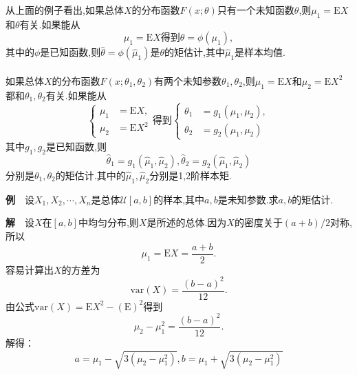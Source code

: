 	\begin{frame}
		从上面的例子看出,如果总体$X$的分布函数$F(x;\theta)$只有一个未知函数$\theta$,则$\mu_1 =\mathrm{E}X$和$\theta$有关.如果能从
		\begin{equation}
			\mu_1 = \mathrm{E}X \text{得到}\theta = \phi(\mu_1),
		\end{equation}
		其中的$\phi$是已知函数,则$\widehat{\theta} =\phi(\widehat{\mu}_1) $是$\theta$的矩估计,其中$\widehat{\mu}_1$是样本均值.
		\\ \hspace*{\fill} \\%
		如果总体$X$的分布函数$F(x;\theta_1,\theta_2)$有两个未知参数$\theta_1,\theta_2$,则$\mu_1 = \mathrm{E}X$和$\mu_2 = \mathrm{E}X^2$都和$\theta_1,\theta_2$有关.如果能从
		\begin{equation}  
		\left\{
		\begin{aligned}
		\mu_1 & = \mathrm{E}X, \\
		\mu_2 & = \mathrm{E}X^2
		\end{aligned}
		\right.\text{得到}
		\left\{
		\begin{aligned}
		\theta_1 & = g_1(\mu_1,\mu_2), \\
		\theta_2 & = g_2(\mu_1,\mu_2)
		\end{aligned}
		\right.
		\end{equation} 
		其中$g_1,g_2$是已知函数,则
		\begin{equation}
			\widehat{\theta}_1 = g_1(\widehat{\mu}_1,\widehat{\mu}_2),\widehat{\theta}_2 = g_2(\widehat{\mu}_1,\widehat{\mu}_2)
		\end{equation} 
		分别是$\theta_1,\theta_2$的矩估计.其中的$\widehat{\mu}_1,\widehat{\mu}_2$分别是1,2阶样本矩.
	\end{frame}

	\begin{frame}
		\textbf{例}$\quad$设$X_1,X_2,\cdots,X_n$是总体$\mathcal{U}[a,b]$的样本,其中$a,b$是未知参数.求$a,b$的矩估计.
		
		\textbf{解}$\quad$设$X$在$[a,b]$中均匀分布,则$X$是所述的总体.因为$X$的密度关于$(a+b)/2$对称,所以
		\begin{equation}
			\mu_1 = \mathrm{E}X = \frac{a+b}{2}.
		\end{equation}
		容易计算出$X$的方差为
		\begin{equation}
			\mathrm{var}(X) = \frac{(b-a)^2}{12}.
		\end{equation}
		由公式$\mathrm{var}(X) = \mathrm{E}X^2 - (\mathrm{E})^2$得到
		\begin{equation}
			\mu_2 - \mu_1^2 = \frac{(b-a)^2}{12}.
		\end{equation}
		解得：
		\begin{equation}
			a = \mu_1 -\sqrt{3(\mu_2 - \mu_1^2)},b = \mu_1 +\sqrt{3(\mu_2 - \mu_1^2)}
		\end{equation}
	\end{frame}

